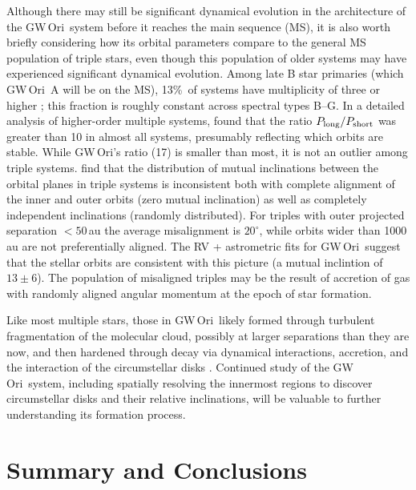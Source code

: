 \documentclass[twocolumn]{aastex61}
\newcommand{\obj}{GW\,Ori}
\begin{document}
Although there may still be significant dynamical evolution in the architecture of the \obj\ system before it reaches the main sequence (MS), it is also worth briefly considering how its orbital parameters compare to the general MS population of triple stars, even though this population of older systems may have experienced significant dynamical evolution. Among late B star primaries (which \obj~A will be on the MS), 13\%\ of systems have multiplicity of three or higher \citep{eggleton08}; this fraction is roughly constant across spectral types B--G. In a detailed analysis of higher-order multiple systems, \citet{tokovinin97} found that the ratio $P_\mathrm{long} / P_{\rm short}$ was greater than 10 in almost all systems, presumably reflecting which orbits are stable. While \obj's ratio (17) is smaller than most, it is not an outlier among triple systems. \citet{tokovinin97,tokovinin17} find that the distribution of mutual inclinations between the orbital planes in triple systems is inconsistent both with complete alignment of the inner and outer orbits (zero mutual inclination) as well as completely independent inclinations (randomly distributed). For triples with outer projected separation $< 50\,$au the average misalignment is $20^\circ$, while orbits wider than 1000 au are not preferentially aligned. The RV + astrometric fits for \obj\ suggest that the stellar orbits are consistent with this picture (a mutual inclintion of $13 \pm 6$\degr). The population of misaligned triples may be the result of accretion of gas with randomly aligned angular momentum at the epoch of star formation.

Like most multiple stars, those in \obj\ likely formed through turbulent fragmentation of the molecular cloud, possibly at larger separations than they are now, and then hardened through decay via dynamical interactions, accretion, and the interaction of the circumstellar disks \citep{offner10,bate12}. Continued study of the \obj\ system, including spatially resolving the innermost regions to discover circumstellar disks and their relative inclinations, will be valuable to further understanding its formation process.


\section{Summary and Conclusions} \label{sec:summary}
\end{document}
